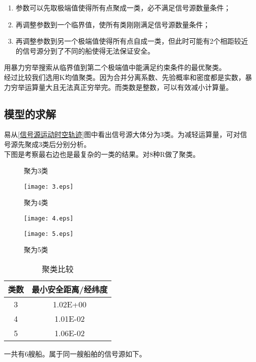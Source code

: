 \begin{enumerate}
	\item 参数可以先取极端值使得所有点聚成一类，必不满足信号源数量条件；
	\item 再调整参数到一个临界值，使所有类刚刚满足信号源数量条件；
	\item 再调整参数到另一个极端值使得所有点自成一类，但此时可能有2个相距较近的信号源分到了不同的船使得无法保证安全。
\end{enumerate}
\par 用暴力穷举搜索从临界值到第二个极端值中能满足约束条件的最优聚类。
\\\indent 经过比较我们选用K均值聚类。因为合并分离系数、先验概率和密度都是实数，暴力穷举运算量大且无法真正穷举完。而类数是整数，可以有效减小计算量。
\subsection{模型的求解}
易从\ref{信号源运动时空轨迹}图中看出信号源大体分为3类。为减轻运算量，可对信号源先聚成3类后分别分析。
\\\indent 下图是考察最右边也是最复杂的一类的结果。对8种R做了聚类。
\begin{figure}[htbp]
	\centering
	\begin{minipage}[htbp]{4cm}
		\centering
		\caption{聚为3类}
		\texttt{[image: 3.eps]}
	\end{minipage}
	\begin{minipage}[htbp]{4cm}
		\centering
		\caption{聚为4类}
		\texttt{[image: 4.eps]}
	\end{minipage}
	\begin{minipage}[htbp]{5cm}
		\centering
		\caption{聚为5类}
		\texttt{[image: 5.eps]}
	\end{minipage}
\end{figure}
\begin{table}[htbp]
	\centering
	\caption{聚类比较}
	\begin{tabular}{cc}
		\toprule
		类数		&	最小安全距离/经纬度	\\
		\midrule
		3		&	1.02E+00				\\
		4		&	1.01E-02				\\
		5		&	1.06E-02				\\
		\bottomrule
	\end{tabular}
\end{table}
\par 一共有6艘船。属于同一艘船舶的信号源如下。

